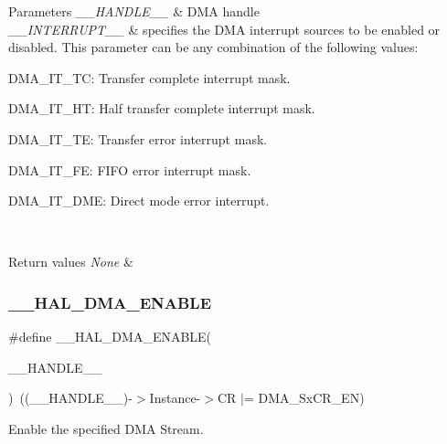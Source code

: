 \begin{DoxyParams}{Parameters}
{\em \+\_\+\+\_\+\+H\+A\+N\+D\+L\+E\+\_\+\+\_\+} & D\+MA handle \\
\hline
{\em \+\_\+\+\_\+\+I\+N\+T\+E\+R\+R\+U\+P\+T\+\_\+\+\_\+} & specifies the D\+MA interrupt sources to be enabled or disabled. This parameter can be any combination of the following values\+: \begin{DoxyItemize}
\item D\+M\+A\+\_\+\+I\+T\+\_\+\+TC\+: Transfer complete interrupt mask. \item D\+M\+A\+\_\+\+I\+T\+\_\+\+HT\+: Half transfer complete interrupt mask. \item D\+M\+A\+\_\+\+I\+T\+\_\+\+TE\+: Transfer error interrupt mask. \item D\+M\+A\+\_\+\+I\+T\+\_\+\+FE\+: F\+I\+FO error interrupt mask. \item D\+M\+A\+\_\+\+I\+T\+\_\+\+D\+ME\+: Direct mode error interrupt. \end{DoxyItemize}
\\
\hline
\end{DoxyParams}

\begin{DoxyRetVals}{Return values}
{\em None} & \\
\hline
\end{DoxyRetVals}
\mbox{\label{group___d_m_a_ga93900b3ef3f87ef924eb887279a434b4}} 
\subsubsection{\texorpdfstring{\+\_\+\+\_\+\+H\+A\+L\+\_\+\+D\+M\+A\+\_\+\+E\+N\+A\+B\+LE}{\_\_HAL\_DMA\_ENABLE}}
{\footnotesize\ttfamily \#define \+\_\+\+\_\+\+H\+A\+L\+\_\+\+D\+M\+A\+\_\+\+E\+N\+A\+B\+LE(\begin{DoxyParamCaption}\item[{}]{\+\_\+\+\_\+\+H\+A\+N\+D\+L\+E\+\_\+\+\_\+ }\end{DoxyParamCaption})~((\+\_\+\+\_\+\+H\+A\+N\+D\+L\+E\+\_\+\+\_\+)-\/$>$Instance-\/$>$CR $\vert$=  D\+M\+A\+\_\+\+Sx\+C\+R\+\_\+\+EN)}



Enable the specified D\+MA Stream. 


